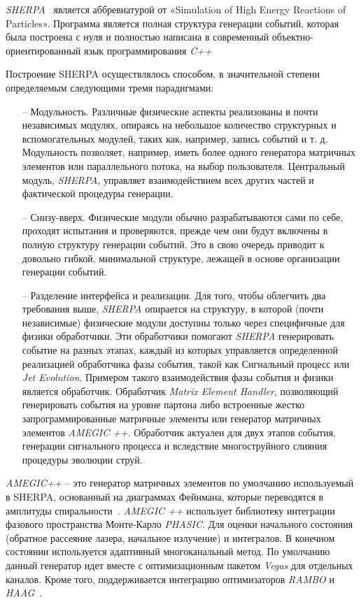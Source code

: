 \textit{SHERPA}~\cite{review-sherpa} является аббревиатурой от «Simulation of High Energy Reactions of Particles». Программа является
полная структура генерации событий, которая была построена с нуля и полностью написана в
современный объектно-ориентированный язык программирования \textit{C++}

Построение SHERPA осуществлялось способом, в значительной степени определяемым следующими тремя парадигмами:

\begin{enumerate}
	\item[--] Модульность. Различные физические аспекты реализованы в почти независимых модулях, опираясь на
	небольшое количество структурных и вспомогательных модулей, таких как, например, запись событий и т. д. Модульность
	позволяет, например, иметь более одного генератора матричных элементов или параллельного потока,
	на выбор пользователя. Центральный модуль, \textit{SHERPA}, управляет взаимодействием
	всех других частей и фактической процедуры генерации.
	\item[--] Снизу-вверх. Физические модули обычно разрабатываются сами по себе, проходят испытания и
	проверяются, прежде чем они будут включены в полную структуру генерации событий. Это в свою очередь
	приводит к довольно гибкой, минимальной структуре, лежащей в основе организации генерации событий.
	\item[--] Разделение интерфейса и реализации. Для того, чтобы облегчить два требования выше,
	\textit{SHERPA} опирается на структуру, в которой (почти независимые) физические модули доступны только
	через специфичные для физики обработчики. Эти обработчики помогают \textit{SHERPA} генерировать событие на разных
	этапах, каждый из которых управляется определенной реализацией обработчика фазы события, такой как
	Сигнальный процесс или \textit{Jet Evolution}. Примером такого взаимодействия фазы события и физики является обработчик. Обработчик \textit{Matrix Element Handler}, позволяющий генерировать события на уровне партона либо
	встроенные жестко запрограммированные матричные элементы или генератор матричных элементов \textit{AMEGIC ++}. Обработчик
	актуален для двух этапов события, генерации сигнального процесса и вследствие многоструйного слияния процедуры эволюции струй.
\end{enumerate}

\textit{AMEGIC++} -- это генератор матричных элементов по умолчанию используемый в SHERPA, основанный на диаграммах Фейнмана, которые переводятся в амплитуды спиральности~\cite{review-sherpa}.\textit{ AMEGIC ++} использует библиотеку интеграции фазового пространства Монте-Карло \textit{PHASIC}. Для оценки начального состояния (обратное рассеяние лазера, начальное излучение) и интегралов. В конечном состоянии используется адаптивный многоканальный метод. По умолчанию данный генератор идет вместе с оптимизационным пакетом \textit{Vegas} для отдельных каналов. Кроме того, поддерживается интеграцию оптимизаторов \textit{RAMBO} и \textit{HAAG}~\cite{review-sherpa}.

